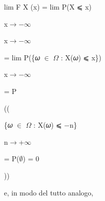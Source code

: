\documentclass[a4paper,portrait,12pt]{article}
\begin{document}
\begin{flushleft}
lim F X (x) = lim P(X ⩽ x)
\end{flushleft}





\begin{flushleft}
x$\rightarrow$$-$$\infty$
\end{flushleft}





\begin{flushleft}
x$\rightarrow$$-$$\infty$
\end{flushleft}





\begin{flushleft}
= lim P(\{𝜔 $\in$ $\Omega$ : X(𝜔) ⩽ x\})
\end{flushleft}


\begin{flushleft}
x$\rightarrow$$-$$\infty$
\end{flushleft}





\begin{flushleft}
= P
\end{flushleft}





((





\begin{flushleft}
\{𝜔 $\in$ $\Omega$ : X(𝜔) ⩽ $-$n\}
\end{flushleft}





\begin{flushleft}
n$\rightarrow$+$\infty$
\end{flushleft}





\begin{flushleft}
= P($\emptyset$) = 0
\end{flushleft}





))





\begin{flushleft}
e, in modo del tutto analogo,
\end{flushleft}
\end{document}
